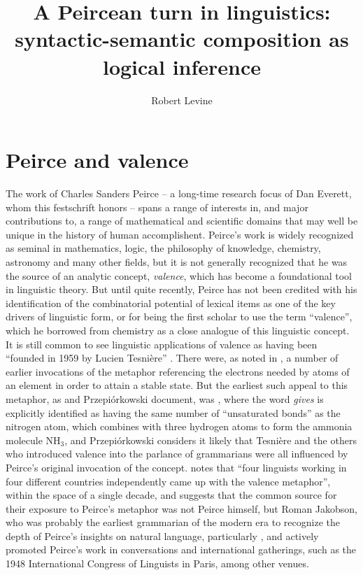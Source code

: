 \documentclass[output=paper,colorlinks,citecolor=brown]{langscibook}
\title{A Peircean turn in linguistics: syntactic-semantic composition as logical inference}
\author{Robert Levine\affiliation{Ohio State University}}
\begin{document}
\maketitle
\providecommand{\SetInfLen}{\relax}


\section{Peirce and valence}

The work of Charles Sanders Peirce -- a long-time research focus of Dan
Everett, whom this festschrift honors -- spans a range of interests in,
and major contributions to, a range of mathematical and scientific
domains that may well be unique in the history of human
accomplishent. Peirce's work is widely recognized as seminal in
mathematics, logic, the philosophy of knowledge, chemistry, astronomy
and many other fields, but it is not generally recognized that he was
the source of an analytic concept, \textsl{valence}, which has become
a foundational tool in linguistic theory. But until quite recently,
Peirce has not been credited with his identification of the
combinatorial potential of lexical items as one of the key drivers of
linguistic form, or for being the first scholar to use the term
``valence'', which he borrowed from chemistry as a close analogue of
this linguistic concept. It is still common to see linguistic
applications of valence as having been ``founded in 1959 by Lucien
Tesnière'' \citep{hollein2022}. There were, as noted in \citet{AdamP-Peirce}, a
number of earlier invocations of the metaphor referencing the
electrons needed by atoms of an element in order to attain a stable
state. But the earliest such appeal to this metaphor, as \citet{askedal91}
and Przepi\'{o}rkowski document, was \citet{peirce1897}, where the word
\textit{gives} is explicitly identified as having the same number of
``unsaturated bonds'' as the nitrogen atom, which combines with three
hydrogen atoms to form the ammonia molecule NH$_3$, and
Przepi{\'o}rkowski considers it likely that Tesnière and the
others who introduced valence into the parlance of grammarians were
all influenced by Peirce's original invocation of the
concept. \citet[155]{AdamP-Peirce} notes that ``four linguists working
in four different countries independently came up with the valence
metaphor'', within the space of a single decade, and suggests that the
common source for their exposure to Peirce's metaphor was not Peirce
himself, but Roman Jakobson, who was probably the earliest
grammarian of the modern era to recognize the depth of Peirce's
insights on natural language, particularly \citet{peirce1897}, and actively
promoted Peirce's work in conversations and international gatherings,
such as the 1948 International Congress of Linguists in Paris, among
other venues.
\end{document}
